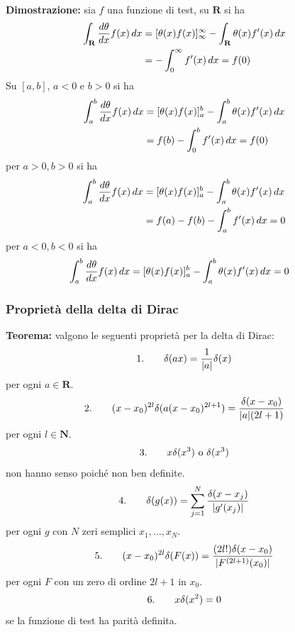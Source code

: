\documentclass{article}
\begin{document}
\textbf{Dimostrazione:} sia $f$ una funzione di test, su $\mathbf{R}$ si ha
\begin{align}
    \int_{\mathbf{R}}\frac{d\theta}{dx}f(x) \, dx &= [\theta(x)f(x)]_{\infty}^{\infty} - \int_{\mathbf{R}}\theta(x)f'(x) \, dx \notag \\
    &= - \int_0^\infty f'(x) \, dx = f(0) \notag
\end{align}
Su $[a, b]$, $a < 0$ e $b > 0$ si ha
\begin{align}
    \int_a^b\frac{d\theta}{dx}f(x) \, dx &= [\theta(x)f(x)]_a^b - \int_a^b\theta(x)f'(x) \, dx \notag \\
    &= f(b) - \int_0^b f'(x) \, dx = f(0) \notag
\end{align}
per $a > 0, b > 0$ si ha
\begin{align}
    \int_a^b\frac{d\theta}{dx}f(x) \, dx &= [\theta(x)f(x)]_a^b - \int_a^b\theta(x)f'(x) \, dx \notag \\
    &= f(a) - f(b) - \int_a^bf'(x) \, dx = 0 \notag
\end{align}
per $a < 0, b < 0$ si ha
\begin{align}
    \int_a^b\frac{d\theta}{dx}f(x) \, dx &= [\theta(x)f(x)]_a^b - \int_a^b\theta(x)f'(x) \, dx = 0 \notag
\end{align}

\subsubsection{Proprietà della delta di Dirac}
\textbf{Teorema:} valgono le seguenti proprietà per la delta di Dirac:
\begin{gather}
    1. \qquad \delta(ax) = \frac{1}{|a|}\delta(x) \notag
\end{gather}
per ogni $a \in \mathbf{R}$.
\begin{gather}
    2. \qquad (x - x_0)^{2l}\delta(a(x - x_0)^{2l + 1}) = \frac{\delta(x - x_0)}{|a|(2l + 1)} \notag
\end{gather}
per ogni $l \in \mathbf{N}$.
\begin{gather}
    3. \qquad x\delta(x^3) \text{ o } \delta(x^3) \notag
\end{gather}
non hanno senso poiché non ben definite.
\begin{gather}
    4. \qquad \delta(g(x)) = \sum_{j = 1}^N\frac{\delta(x - x_j)}{|g'(x_j)|} \notag
\end{gather}
per ogni $g$ con $N$ zeri semplici $x_1, \dots, x_N$.
\begin{gather}
    5. \qquad (x - x_0)^{2l}\delta(F(x)) = \frac{(2l!)\delta(x - x_0)}{|F^{(2l + 1)}(x_0)|} \notag
\end{gather}
per ogni $F$ con un zero di ordine $2l + 1$ in $x_0$.
\begin{gather}
    6. \qquad x\delta(x^2) = 0 \notag
\end{gather}
se la funzione di test ha parità definita. \\
\end{document}
